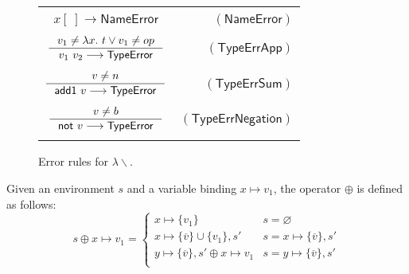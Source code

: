 \documentclass[preprint,authoryear,sort&compress,9pt,nocopyrightspace]{article}
\newcommand\rulename[1]{\mathsf{(#1)}}
\newcommand{\tto}{\longrightarrow}
\newcommand{\absST}[2]{\lambda #1. \ #2}
\newcommand{\negacion}[1]{\mathsf{not} \ #1}
\newcommand{\suma}[1]{\mathsf{add1} \ #1}
\newcommand{\nameerror}{\mathsf{NameError}}
\newcommand{\typeerror}{\mathsf{TypeError}}
\newcommand{\semanticA}{$\lambda\backslash$}
\begin{document}
\begin{figure}[h]
\begin{small}
\begin{center}
\begin{tabular}{|c r|}
\hline
&\\
$x[ \ ] \tto \nameerror$&$\rulename{NameError}$\\
&\\
$\inference {v_1 \neq \absST {x}{t} \vee v_1 \neq op}{v_1 \ v_2 \tto \typeerror}$&$\rulename{TypeErrApp}$\\
&\\
$\inference {v \neq n}{\suma{v} \tto \typeerror}$&$\rulename{TypeErrSum}$\\
&\\
$\inference {v \neq b}{\negacion{v} \tto \typeerror }$&$\rulename{TypeErrNegation}$\\
&\\
\hline
\end{tabular}
\caption{Error rules for \semanticA.}
\label{tabla:rules1errors}
\end{center}
\end{small}
\end{figure}


\begin{definition}[$\oplus$]
\label{definition:tcs}
\mbox{}
Given an environment  $s$ and a variable binding $x \mapsto v_1$, the operator $\oplus$ is defined  as follows:
\[ s \oplus x \mapsto v_1 = \begin{cases} 
      x \mapsto \{v_1\}& s =  \varnothing \\
      x \mapsto \{\overline{v}\} \cup \{v_1\}, s' & s = x \mapsto \{\overline{v }\}, s'\\
      y \mapsto \{\overline{v}\}, s' \oplus x \mapsto v_1 & s = y \mapsto \{\overline{v}\}, s'\\
   \end{cases}
\]
\end{definition}
\end{document}
